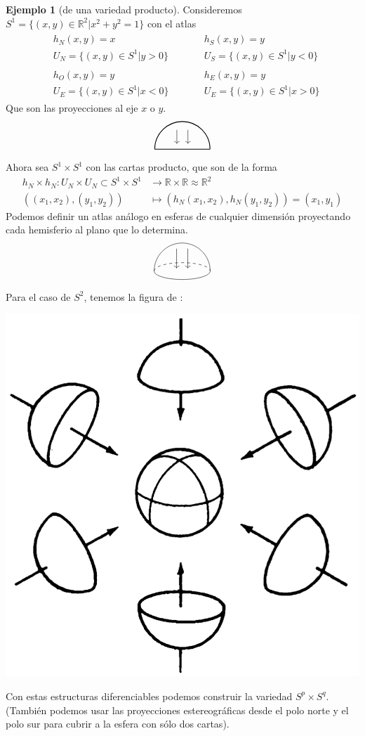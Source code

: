 \documentclass[spanish]{book}
\theoremstyle{definition}
\newtheorem*{ejem}{Ejemplo}
\newcommand{\R}{\mathbb{R}}
\begin{document}
	\begin{ejem}[de una variedad producto]
		Consideremos $S^1=\{(x,y)\in\R^2|x^2+y^2=1\}$ con el atlas
		\begin{align*}
			\begin{aligned}
				&h_N(x,y)=x\\
				&U_N=\{(x,y)\in S^1|y>0\}\\\\
				&h_O(x,y)=y\\
				&U_E=\{(x,y)\in S^1|x<0\}
			\end{aligned}
			\qquad
			\begin{aligned}
				&h_S(x,y)=y\\
				&U_S=\{(x,y)\in S^1|y<0\}\\\\
				&h_E(x,y)=y\\
				&U_E=\{(x,y)\in S^1|x>0\}
			\end{aligned}
		\end{align*}
		Que son las proyecciones al eje $x$ o $y$.
		\[\begin{tikzpicture}
			\draw[thick] (1,0) arc (0:180:1);
			\draw[thick] (-1,0) -- (1,0);
			\draw[->] (-.2,0.7)--(-.2,0.2);
			\draw[->] (.2,0.7)--(.2,0.2);
		\end{tikzpicture}\]
		Ahora sea $S^1\times S^1$ con las cartas producto, que son de la forma
		\begin{align*}
			h_N\times h_N:U_N\times U_N\subset S^1\times S^1&\to\R\times\R\approx\R^2\\
			\left((x_1,x_2),(y_1,y_2)\right)&\mapsto\left(h_N(x_1,x_2),h_N(y_1,y_2)\right)=(x_1,y_1)
		\end{align*}
		Podemos definir un atlas análogo en esferas de cualquier dimensión proyectando cada hemisferio al plano que lo determina.
		\[\begin{tikzpicture}[scale=1]
			\draw (-1,0) arc (180:0:1);
			\draw (-1,0) arc (180:360:1 and 0.3);
			\draw[dashed] (-1,0) arc (180:0:1 and 0.3);
			\draw[->] (-.2,0.8)--(-.2,0.1);
			\draw[->] (.2,0.8)--(.2,0.1);
		\end{tikzpicture}\]
		Para el caso de $S^2$, tenemos la figura de \cite{DoCarmo}:
		\begin{center}
			\includegraphics[width=0.5\linewidth]{fig1.png}
		\end{center}
		Con estas estructuras diferenciables podemos construir la variedad $S^p\times S^q$. (También podemos usar las proyecciones estereográficas desde el polo norte y el polo sur para cubrir a la esfera con sólo dos cartas).
	\end{ejem}
\end{document}
